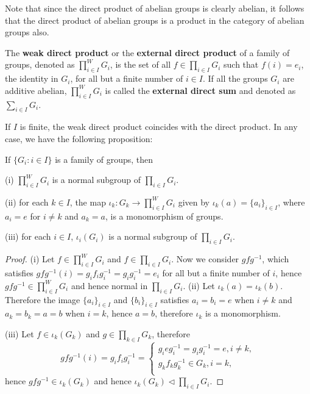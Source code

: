 Note that since the direct product of abelian groups is clearly abelian, it follows that the direct product of abelian groups is a product in the category of abelian groups also.\par
\begin{definition}
The \textbf{weak direct product} or the \textbf{external direct product} of a family of groups, denoted as ${\prod}^W_{i\in I}G_i$, is the set of all $f\in\prod_{i\in I}G_i$ such that $f(i)=e_i$, the identity in $G_i$, for all but a finite number of $i\in I$. If all the groups $G_i$ are additive abelian, ${\prod}^W_{i\in I}G_i$ is called the \textbf{external direct sum} and denoted as $\sum_{i\in I}G_i$.
\end{definition}
If $I$ is finite, the weak direct product coincides with the direct product. In any case, we have the following proposition:
\begin{proposition}
If $\{G_i:i\in I\}$ is a family of groups, then\par
(i) ${\prod}^W_{i\in I}G_i$ is a normal subgroup of $\prod_{i\in I}G_i$.\par
(ii) for each $k\in I$, the map $\iota_k:G_k\to{\prod}^W_{i\in I}G_i$ given by $\iota_k(a)=\{a_i\}_{i\in I}$, where $a_i=e$ for $i\ne k$ and $a_k=a$, is a monomorphism of groups.\par
(iii) for each $i\in I$, $\iota_i(G_i)$ is a normal subgroup of $\prod_{i\in I}G_i$.
\end{proposition}
\begin{proof}
(i) Let $f\in{\prod}^W_{i\in I}G_i$ and $f\in\prod_{i\in I}G_i$. Now we consider $gfg^{-1}$, which satisfies $gfg^{-1}(i)=g_if_ig_i^{-1}=g_ig_i^{-1}=e_i$ for all but a finite number of $i$, hence $gfg^{-1}\in{\prod}^W_{i\in I}G_i$ and hence normal in $\prod_{i\in I}G_i$.
(ii) Let $\iota_k(a)=\iota_k(b)$. Therefore the image $\{a_i\}_{i\in I}$ and $\{b_i\}_{i\in I}$ satisfies $a_i=b_i=e$ when $i\ne k$ and $a_k=b_k=a=b$ when $i=k$, hence $a=b$, therefore $\iota_k$ is a monomorphism.\par
(iii) Let $f\in\iota_k(G_k)$ and $g\in\prod_{k\in I}G_k$, therefore 
$$
gfg^{-1}\left( i \right) =g_if_ig_{i}^{-1}=\begin{cases}
	g_ieg_{i}^{-1}=g_ig_{i}^{-1}=e,i\ne k,\\
	g_kf_kg_{k}^{-1}\in G_k,i=k,\\
\end{cases}
$$
hence $gfg^{-1}\in\iota_k(G_k)$ and hence $\iota_k(G_k)\lhd\prod_{i\in I}G_i$.
\end{proof}

